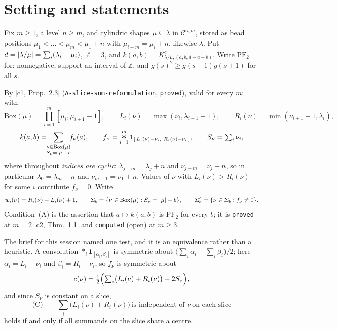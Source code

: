 \documentclass[11pt]{article}
\theoremstyle{definition}
\newcommand{\Z}{\mathbb Z}
\newcommand{\PFtwo}{\mathrm{PF}_2}
\newcommand{\Bx}{\mathrm{Box}}
\DeclarePairedDelimiter{\abs}{\lvert}{\rvert}
\begin{document}
\section{Setting and statements}

Fix $m\ge1$, a level $n\ge m$, and cylindric shapes $\mu\subseteq\lambda$ in
$\mathcal C^{n,m}$, stored as bead positions $\mu_1<\dots<\mu_m<\mu_1+n$ with
$\mu_{i+m}=\mu_i+n$, likewise $\lambda$. Put $d=\abs{\lambda/\mu}=\sum_i(\lambda_i-\mu_i)$,
$\ell=3$, and $k(a,b)=K^c_{\lambda/\mu,(a,b,d-a-b)}$. Write $\PFtwo$ for: nonnegative,
support an interval of $\Z$, and $g(s)^2\ge g(s-1)g(s+1)$ for all $s$.

By [c1, Prop.~2.3] (\texttt{A-slice-sum-reformulation}, \texttt{proved}), valid for every
$m$: with
\begin{equation}\label{eq:setup}
  \Bx(\mu)=\prod_{i=1}^m[\mu_i,\mu_{i+1}-1],\qquad
  L_i(\nu)=\max(\nu_i,\lambda_{i-1}+1),\qquad
  R_i(\nu)=\min(\nu_{i+1}-1,\lambda_i),
\end{equation}
\begin{equation}\label{eq:slice}
  k(a,b)=\!\!\sum_{\substack{\nu\in\Bx(\mu)\\ S_\nu=\abs{\mu}+b}}\!\! f_\nu(a),
  \qquad
  f_\nu=\mathop{\text{\Large$*$}}_{i=1}^{m}\mathbf 1_{[\,L_i(\nu)-\nu_i,\ R_i(\nu)-\nu_i\,]},
  \qquad S_\nu=\textstyle\sum_i\nu_i,
\end{equation}
where throughout \emph{indices are cyclic}: $\lambda_{j+m}=\lambda_j+n$ and
$\nu_{j+m}=\nu_j+n$, so in particular $\lambda_0=\lambda_m-n$ and $\nu_{m+1}=\nu_1+n$.
Values of $\nu$ with $L_i(\nu)>R_i(\nu)$ for some $i$ contribute $f_\nu=0$. Write
\[
  w_i(\nu)=R_i(\nu)-L_i(\nu)+1,\qquad
  \Sigma_b=\{\nu\in\Bx(\mu):S_\nu=\abs{\mu}+b\},\qquad
  \Sigma_b^{\circ}=\{\nu\in\Sigma_b: f_\nu\ne0\}.
\]
Condition~(A) is the assertion that $a\mapsto k(a,b)$ is $\PFtwo$ for every $b$; it is
\texttt{proved} at $m=2$ [c2, Thm.~1.1] and \texttt{computed} (open) at $m\ge3$.

The brief for this session named one test, and it is an equivalence rather than a heuristic.
A convolution $*_i\mathbf 1_{[\alpha_i,\beta_i]}$ is symmetric about
$\bigl(\sum_i\alpha_i+\sum_i\beta_i\bigr)/2$; here $\alpha_i=L_i-\nu_i$ and
$\beta_i=R_i-\nu_i$, so $f_\nu$ is symmetric about
\begin{equation}\label{eq:centre}
  c(\nu)=\tfrac12\Bigl(\textstyle\sum_i\bigl(L_i(\nu)+R_i(\nu)\bigr)-2S_\nu\Bigr),
\end{equation}
and since $S_\nu$ is constant on a slice,
\begin{equation}\label{eq:C}
  \text{(C)}\qquad \textstyle\sum_i\bigl(L_i(\nu)+R_i(\nu)\bigr)\ \text{is independent of }
  \nu\ \text{on each slice}
\end{equation}
holds if and only if all summands on the slice share a centre.
\end{document}
